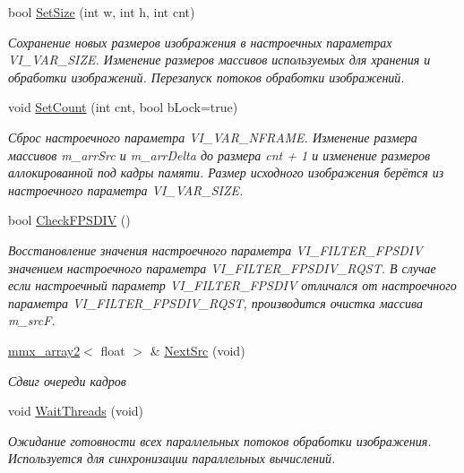 \begin{DoxyCompactItemize}
bool \hyperlink{class_c_v_i_engine_base_a930661f73cc7c449c166071631be595d}{Set\+Size} (int w, int h, int cnt)
\begin{DoxyCompactList}\small\item\em Сохранение новых размеров изображения в настроечных параметрах V\+I\+\_\+\+V\+A\+R\+\_\+\+S\+I\+Z\+E. Изменение размеров массивов используемых для хранения и обработки изображений. Перезапуск потоков обработки изображений. \end{DoxyCompactList}\item 
void \hyperlink{class_c_v_i_engine_base_a042d710f3a5be21538478ad157680828}{Set\+Count} (int cnt, bool b\+Lock=true)
\begin{DoxyCompactList}\small\item\em Сброс настроечного параметра V\+I\+\_\+\+V\+A\+R\+\_\+\+N\+F\+R\+A\+M\+E. Изменение размера массивов m\+\_\+arr\+Src и m\+\_\+arr\+Delta до размера cnt + 1 и изменение размеров аллокированной под кадры памяти. Размер исходного изображения берётся из настроечного параметра V\+I\+\_\+\+V\+A\+R\+\_\+\+S\+I\+Z\+E. \end{DoxyCompactList}\item 
bool \hyperlink{class_c_v_i_engine_base_a4764b56d4269ed5cd101dddf545e039d}{Check\+F\+P\+S\+D\+I\+V} ()
\begin{DoxyCompactList}\small\item\em Восстановление значения настроечного параметра V\+I\+\_\+\+F\+I\+L\+T\+E\+R\+\_\+\+F\+P\+S\+D\+I\+V значением настроечного параметра V\+I\+\_\+\+F\+I\+L\+T\+E\+R\+\_\+\+F\+P\+S\+D\+I\+V\+\_\+\+R\+Q\+S\+T. В случае если настроечный параметр V\+I\+\_\+\+F\+I\+L\+T\+E\+R\+\_\+\+F\+P\+S\+D\+I\+V отличался от настроечного параметра V\+I\+\_\+\+F\+I\+L\+T\+E\+R\+\_\+\+F\+P\+S\+D\+I\+V\+\_\+\+R\+Q\+S\+T, производится очистка массива m\+\_\+src\+F. \end{DoxyCompactList}\item 
\hyperlink{classmmx__array2}{mmx\+\_\+array2}$<$ float $>$ \& \hyperlink{class_c_v_i_engine_base_aa1aa2604f40dd77bc49ca6ff8fd81535}{Next\+Src} (void)
\begin{DoxyCompactList}\small\item\em Сдвиг очереди кадров \end{DoxyCompactList}\item 
void \hyperlink{class_c_v_i_engine_base_a305c1b2285ddfcdbb021597f0b3dbd39}{Wait\+Threads} (void)
\begin{DoxyCompactList}\small\item\em Ожидание готовности всех параллельных потоков обработки изображения. Используется для синхронизации параллельных вычислений. \end{DoxyCompactList}\item 

\end{DoxyCompactItemize}
